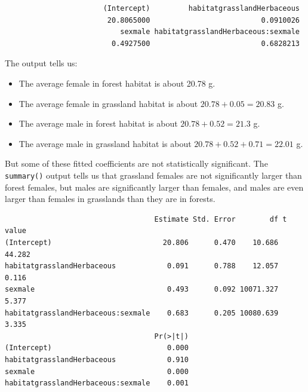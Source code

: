 \documentclass[
  13,
  letterpaper,
]{report}
\newenvironment{Shaded}{\begin{snugshade}}{\end{snugshade}}
\newcommand{\DecValTok}[1]{\textcolor[rgb]{0.68,0.00,0.00}{#1}}
\newcommand{\FunctionTok}[1]{\textcolor[rgb]{0.28,0.35,0.67}{#1}}
\newcommand{\NormalTok}[1]{\textcolor[rgb]{0.00,0.23,0.31}{#1}}
\newcommand{\SpecialCharTok}[1]{\textcolor[rgb]{0.37,0.37,0.37}{#1}}
\providecommand{\tightlist}{%
  \setlength{\itemsep}{0pt}\setlength{\parskip}{0pt}}
\begin{document}
\begin{verbatim}
                       (Intercept)         habitatgrasslandHerbaceous 
                        20.8065000                          0.0910026 
                           sexmale habitatgrasslandHerbaceous:sexmale 
                         0.4927500                          0.6828213 
\end{verbatim}

The output tells us:

\begin{itemize}
\tightlist
\item
  The average female in forest habitat is about 20.78 g.
\item
  The average female in grassland habitat is about \(20.78+0.05=20.83\)
  g.
\item
  The average male in forest habitat is about \(20.78+0.52=21.3\) g.
\item
  The average male in grassland habitat is about
  \(20.78+0.52+0.71=22.01\) g.
\end{itemize}

But some of these fitted coefficients are not statistically significant.
The \texttt{summary()} output tells us that grassland females are not
significantly larger than forest females, but males are significantly
larger than females, and males are even larger than females in
grasslands than they are in forests.

\begin{Shaded}
\end{Shaded}

\begin{verbatim}
                                   Estimate Std. Error        df t value
(Intercept)                          20.806      0.470    10.686  44.282
habitatgrasslandHerbaceous            0.091      0.788    12.057   0.116
sexmale                               0.493      0.092 10071.327   5.377
habitatgrasslandHerbaceous:sexmale    0.683      0.205 10080.639   3.335
                                   Pr(>|t|)
(Intercept)                           0.000
habitatgrasslandHerbaceous            0.910
sexmale                               0.000
habitatgrasslandHerbaceous:sexmale    0.001
\end{verbatim}
\end{document}
